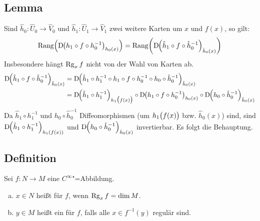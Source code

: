 \subsection[Lemma: Die Definition des Ranges hängt nicht von Karten ab]{Lemma} %
\label{sub:164}
Sind $\hat{h}_0 : \hat{U}_0 \to \hat{V}_0$ und $\hat{h}_1 : \hat{U}_1 \to \hat{V}_1$ zwei weitere Karten um $x$ und $f(x)$, so gilt:
\[
	\mathrm{Rang} \enbrace*{\D \enbrace*{h_1 \circ f \circ h_0 ^{-1}}_{h_0(x)} } = \mathrm{Rang} \enbrace*{\D \enbrace*{\hat{h}_1 \circ f \circ \hat{h}_0 ^{-1}}_{\hat{h}_0(x)} }  
\]
Insbesondere hängt $\Rg_x f$ nicht von der Wahl von Karten ab.
\begin{align*}
	\D \enbrace*{\hat{h}_1 \circ f \circ \hat{h}_0 ^{-1}}_{\hat{h}_0(x)}&= \D \enbrace*{\hat{h}_1 \circ h_1 ^{-1} \circ h_1 \circ f \circ h_0 ^{-1} \circ h_0 \circ \hat{h}_0 ^{-1}}_{\hat{h}_0(x)}\\
	&= \D \enbrace*{\hat{h}_1 \circ  h_1 ^{-1}}_{h_1\enbrace[\big]{f(x)}} \circ  \D \enbrace*{h_1 \circ f \circ h_0 ^{-1}}_{h_0(x)} \circ \D \enbrace*{h_0 \circ \hat{h}_0 ^{-1}}_{\hat{h}_0(x)}   
\end{align*}
Da $\hat{h}_1 \circ h_1 ^{-1}$ und $h_0 \circ \hat{h}_0 ^{-1}$ Diffeomorphismen (um $h_1\enbrace[\big]{f(x)}$ bzw. $\hat{h}_0 (x)$) sind, sind 
$\D \enbrace*{\hat{h}_1 \circ  h_1 ^{-1}}_{h_1\enbrace*{f(x)}}$ und $\D \enbrace*{h_0 \circ \hat{h}_0 ^{-1}}_{\hat{h}_0(x)}$ invertierbar. Es folgt die Behauptung. \bewende

\subsection[Definition: reguläre Werte]{Definition} %
\label{sub:166}
Sei $f : N \to M$ eine $C^\infty$"=Abbildung.
\begin{enumerate}[a)]
	\item $x \in N$ heißt  für $f$, wenn $\Rg_x f = \dim M$.
	\item $y \in M$ heißt ein  für $f$, falls alle $x \in f ^{-1} (y)$ regulär sind.
\end{enumerate}

